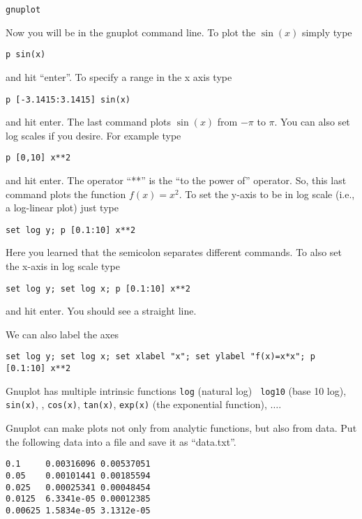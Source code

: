 \documentclass[aps,showpacs,prd,notitlepage,preprintnumbers,amsmath,amssymb,letterpaper]{revtex4}
\begin{document}
\begin{verbatim}
gnuplot
\end{verbatim}

Now you will be in the gnuplot command line. To plot the $\sin(x)$ simply type

\begin{verbatim}
p sin(x)
\end{verbatim}

and hit ``enter''. To specify a range in the x axis type

\begin{verbatim}
p [-3.1415:3.1415] sin(x) 
\end{verbatim}

and hit enter.  The last command plots $\sin(x)$ from $-\pi$ to
$\pi$. You can also set log scales if you desire. For example type

\begin{verbatim}
p [0,10] x**2 
\end{verbatim}

and hit enter. The operator ``**'' is the ``to the power of'' operator. So,
this last command plots the function $f(x)=x^2$. To set the y-axis to be in log
scale (i.e., a log-linear plot) just type

\begin{verbatim}
set log y; p [0.1:10] x**2 
\end{verbatim}

Here you learned that the semicolon separates different commands. To also
set the x-axis in log scale type

\begin{verbatim}
set log y; set log x; p [0.1:10] x**2 
\end{verbatim}
and hit enter. You should see a straight line.

We can also label the axes

\begin{verbatim}
set log y; set log x; set xlabel "x"; set ylabel "f(x)=x*x"; p [0.1:10] x**2 
\end{verbatim}

Gnuplot has multiple intrinsic functions {\tt log} (natural log) {\tt
  log10} (base 10 log), {\tt sin(x)}, , {\tt cos(x)}, {\tt tan(x)},
{\tt exp(x)} (the exponential function), $\ldots$.

Gnuplot can make plots not only from analytic functions, but also from data.
Put the following data into a file and save it as ``data.txt''.

\begin{verbatim}
0.1     0.00316096 0.00537051 
0.05    0.00101441 0.00185594 
0.025   0.00025341 0.00048454 
0.0125  6.3341e-05 0.00012385 
0.00625 1.5834e-05 3.1312e-05 
\end{verbatim}
\end{document}
